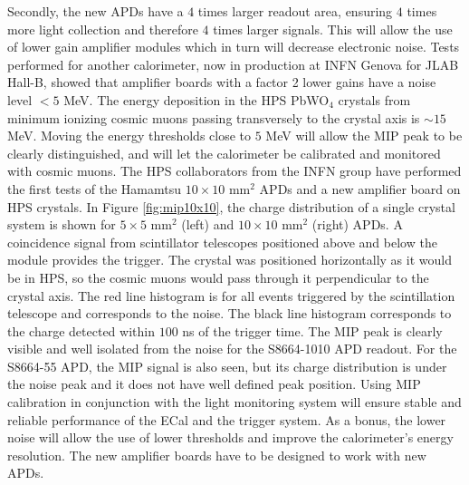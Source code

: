 Secondly, the new APDs have a $4$ times larger readout area, ensuring $4$ times more light collection and therefore $4$ times larger signals. This will allow the use of lower gain amplifier modules which in turn will decrease electronic noise. Tests 
performed for another calorimeter, now in production at INFN Genova for JLAB Hall-B, showed that amplifier boards 
with a factor 2 lower gains have a noise level $<5$ MeV. The energy deposition in the HPS PbWO$_4$ crystals  
from minimum ionizing cosmic muons passing transversely to the crystal axis is $\sim 15$ MeV. Moving the energy thresholds 
close to $5$ MeV will allow the MIP peak to be clearly distinguished, and will let the calorimeter  be calibrated and monitored with cosmic muons. The HPS collaborators 
from the INFN group have performed the first tests of the Hamamtsu $10\times 10$ mm$^2$ APDs and a new amplifier board on HPS crystals. In 
Figure \ref{fig:mip10x10}, the charge distribution of a single crystal system is shown for $5\times 5$ mm$^2$ (left) and $10\times 
10$ mm$^2$ (right) APDs. A coincidence signal from scintillator telescopes positioned above and below the module provides the trigger. 
The crystal was positioned horizontally as it would be in HPS, so the cosmic muons would pass through it perpendicular to the crystal axis. The red line 
histogram is for all events triggered by the scintillation telescope and corresponds to the noise. The black line histogram corresponds 
to the charge detected within $100$ ns of the trigger time. The MIP peak is clearly visible and well isolated from the noise 
for the S8664-1010 APD readout. For  the S8664-55 APD, the MIP signal is also seen, but its charge distribution is under the noise peak and it
does not have well defined peak position. Using MIP calibration in conjunction with the light monitoring system will ensure stable and reliable performance of the ECal and the trigger system. As a bonus, the lower noise will allow the use of lower  thresholds and improve the calorimeter's energy resolution. The new amplifier boards have to be designed to work with new APDs. 

